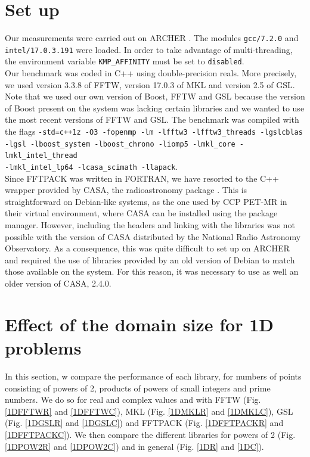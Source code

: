 \documentclass[12pt, a4paper]{article}
\begin{document}
\section{Set up}
Our measurements were carried out on ARCHER \cite{archer}. The modules \texttt{gcc/7.2.0} and \\ \texttt{intel/17.0.3.191} were loaded. In order to take advantage of multi-threading, the environment variable \texttt{KMP\_AFFINITY} must be set to \texttt{disabled}.\\

Our benchmark was coded in C++ using double-precision reals. More precisely, we used version 3.3.8 of FFTW, version 17.0.3 of MKL and version 2.5 of GSL. Note that we used our own version of Boost, FFTW and GSL because the version of Boost present on the system was lacking certain libraries and we wanted to use the most recent versions of FFTW and GSL. The benchmark was compiled with the flags \texttt{-std=c++1z -O3  -fopenmp   -lm -lfftw3 -lfftw3\_threads -lgslcblas -lgsl -lboost\_system -lboost\_chrono -liomp5 -lmkl\_core -lmkl\_intel\_thread \\-lmkl\_intel\_lp64  -lcasa\_scimath  -llapack}.\\

Since FFTPACK was written in FORTRAN, we have resorted to the C++ wrapper provided by CASA, the radioastronomy package \cite{casa}. This is straightforward on Debian-like systems, as the one used by CCP PET-MR in their virtual environment, where CASA can be installed using the package manager. However, including the headers and linking with the libraries was not possible with the version of CASA distributed by the National Radio Astronomy Observatory. As a consequence, this was quite difficult to set up on ARCHER and required the use of libraries provided by an old version of Debian to match those available on the system. For this reason, it was necessary to use as well an older version of CASA, 2.4.0.

\pagebreak
\section{Effect of the domain size for 1D problems}\label{PERFORMANCE1D}

In this section, w compare the performance of each library, for numbers of points consisting of powers of 2, products of powers of small integers and prime numbers. We do so for real and complex values and with FFTW (Fig. \ref{1DFFTWR} and \ref{1DFFTWC}), MKL (Fig. \ref{1DMKLR} and \ref{1DMKLC}), GSL (Fig. \ref{1DGSLR} and \ref{1DGSLC}) and FFTPACK (Fig. \ref{1DFFTPACKR} and \ref{1DFFTPACKC}). We then compare the different libraries for powers of 2 (Fig. \ref{1DPOW2R} and \ref{1DPOW2C}) and in general (Fig. \ref{1DR} and \ref{1DC}).\\
\end{document}
